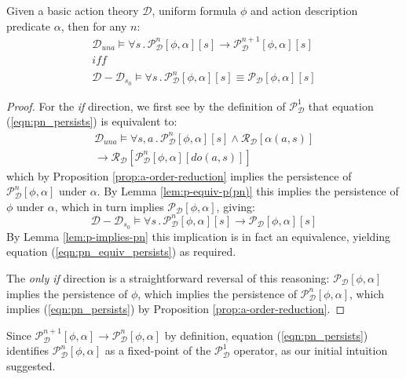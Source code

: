 \begin{thm}
Given a basic action theory $\mathcal{D}$, uniform formula $\phi$
and action description predicate $\alpha$, then for any $n$:\label{thm:p(pn)-equiv-p}\begin{gather}
\mathcal{D}_{una}\models\forall s\,.\,\mathcal{P}_{\mathcal{D}}^{n}[\phi,\alpha][s]\rightarrow\mathcal{P}_{\mathcal{D}}^{n+1}[\phi,\alpha][s]\label{eqn:pn_persists}\\
\mathit{iff}\nonumber \\
\mathcal{D}-\mathcal{D}_{s_{0}}\models\forall s\,.\,\mathcal{P}_{\mathcal{D}}^{n}[\phi,\alpha][s]\equiv\mathcal{P_{D}}[\phi,\alpha][s]\label{eqn:pn_equiv_persists}\end{gather}

\end{thm}
\begin{proof}
For the \emph{if} direction, we first see by the definition of $\mathcal{P}_{\mathcal{D}}^{1}$
that equation (\ref{eqn:pn_persists}) is equivalent to:\begin{multline*}
\mathcal{D}_{una}\models\forall s,a\,.\,\mathcal{P}_{\mathcal{D}}^{n}[\phi,\alpha][s]\wedge\mathcal{R}_{\mathcal{D}}[\alpha(a,s)]\\
\rightarrow\mathcal{R}_{\mathcal{D}}[\mathcal{P}_{\mathcal{D}}^{n}[\phi,\alpha][do(a,s)]]\end{multline*}
 which by Proposition \ref{prop:a-order-reduction} implies the persistence
of $\mathcal{P}_{\mathcal{D}}^{n}[\phi,\alpha]$ under $\alpha$.
By Lemma \ref{lem:p-equiv-p(pn)} this implies the persistence of
$\phi$ under $\alpha$, which in turn implies $\mathcal{P_{D}}[\phi,\alpha]$,
giving:\[
\mathcal{D}-\mathcal{D}_{s_{0}}\models\forall s\,.\,\mathcal{P}_{\mathcal{D}}^{n}[\phi,\alpha][s]\rightarrow\mathcal{P_{D}}[\phi,\alpha][s]\]
 By Lemma \ref{lem:p-implies-pn} this implication is in fact an equivalence,
yielding equation (\ref{eqn:pn_equiv_persists}) as required.

The \emph{only if} direction is a straightforward reversal of this
reasoning: $\mathcal{P_{D}}[\phi,\alpha]$ implies the persistence
of $\phi$, which implies the persistence of $\mathcal{P}_{\mathcal{D}}^{n}[\phi,\alpha]$,
which implies (\ref{eqn:pn_persists}) by Proposition \ref{prop:a-order-reduction}. 
\end{proof}
Since $\mathcal{P}_{\mathcal{D}}^{n+1}[\phi,\alpha]\rightarrow\mathcal{P}_{\mathcal{D}}^{n}[\phi,\alpha]$
by definition, equation (\ref{eqn:pn_persists}) identifies $\mathcal{P}_{\mathcal{D}}^{n}[\phi,\alpha]$
as a fixed-point of the $\mathcal{P}_{\mathcal{D}}^{1}$ operator,
as our initial intuition suggested.


